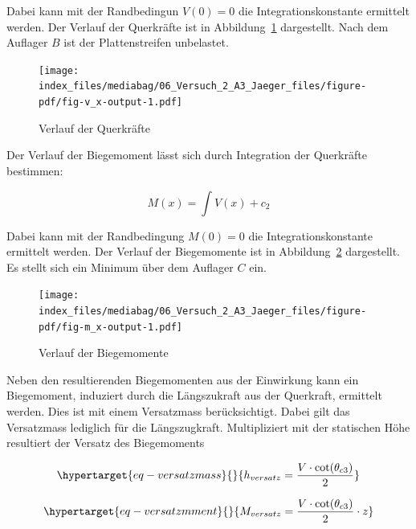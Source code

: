 \documentclass[
  letterpaper,
]{scrreprt}
\begin{document}
Dabei kann mit der Randbedingun \(V(0) = 0\) die Integrationskonstante
ermittelt werden. Der Verlauf der Querkräfte ist in
Abbildung~\ref{fig-v_x} dargestellt. Nach dem Auflager \(B\) ist der
Plattenstreifen unbelastet.

\begin{figure}[H]

{\centering \texttt{[image: index\_files/mediabag/06\_Versuch\_2\_A3\_Jaeger\_files/figure-pdf/fig-v\_x-output-1.pdf]}

}

\caption{\label{fig-v_x}Verlauf der Querkräfte}

\end{figure}

Der Verlauf der Biegemoment lässt sich durch Integration der Querkräfte
bestimmen:

\[
M(x) = \int V(x) + c_2
\]

Dabei kann mit der Randbedingung \(M(0) = 0\) die Integrationskonstante
ermittelt werden. Der Verlauf der Biegemomente ist in
Abbildung~\ref{fig-m_x} dargestellt. Es stellt sich ein Minimum über dem
Auflager \(C\) ein.

\begin{figure}[H]

{\centering \texttt{[image: index\_files/mediabag/06\_Versuch\_2\_A3\_Jaeger\_files/figure-pdf/fig-m\_x-output-1.pdf]}

}

\caption{\label{fig-m_x}Verlauf der Biegemomente}

\end{figure}

Neben den resultierenden Biegemomenten aus der Einwirkung kann ein
Biegemoment, induziert durch die Längszukraft aus der Querkraft,
ermittelt werden. Dies ist mit einem Versatzmass berücksichtigt. Dabei
gilt das Versatzmass lediglich für die Längszugkraft. Multipliziert mit
der statischen Höhe resultiert der Versatz des Biegemoments

\begin{equation}\protect\hypertarget{eq-versatzmass}{}{
h_{versatz} = \frac{V \cdot \cot(\theta_{c3})}{2}
}\label{eq-versatzmass}\end{equation}

\begin{equation}\protect\hypertarget{eq-versatzmment}{}{
M_{versatz} = \frac{V \cdot \cot(\theta_{c3})}{2} \cdot z
}\label{eq-versatzmment}\end{equation}
\end{document}
